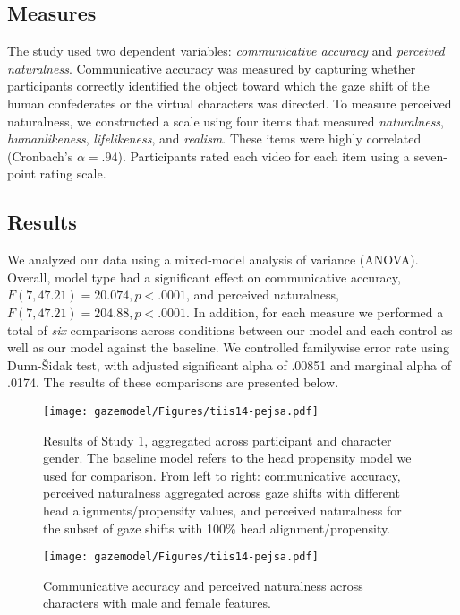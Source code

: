 \subsection{Measures}

The study used two dependent variables: \emph{communicative accuracy} and \emph{perceived naturalness}. Communicative accuracy was measured by capturing whether participants correctly identified the object toward which the gaze shift of the human confederates or the virtual characters was directed. To measure perceived naturalness, we constructed a scale using four items that measured \emph{naturalness}, \emph{humanlikeness}, \emph{lifelikeness}, and \emph{realism}. These items were highly correlated (Cronbach's $\alpha = .94$). Participants rated each video for each item using a seven-point rating scale.

\subsection{Results}

We analyzed our data using a mixed-model analysis of variance (ANOVA). Overall, model type had a significant effect on communicative accuracy, $F(7, 47.21) = 20.074, p < .0001$, and perceived naturalness, $F(7, 47.21) = 204.88, p < .0001$. In addition, for each measure we performed a total of \emph{six} comparisons across conditions between our model and each control as well as our model against the baseline. We controlled familywise error rate using Dunn-\v{S}idak test, with adjusted significant alpha of .00851 and marginal alpha of .0174. The results of these comparisons are presented below.

\begin{figure}
  \centering
  \texttt{[image: gazemodel/Figures/tiis14-pejsa.pdf]}
  \caption{Results of Study 1, aggregated across participant and character gender. The baseline model refers to the head propensity model we used for comparison. From left to right: communicative accuracy, perceived naturalness aggregated across gaze shifts with different head alignments/propensity values, and perceived naturalness for the subset of gaze shifts with 100\% head alignment/propensity.}
  \label{fig:ModelEvalResults}
\end{figure}

\begin{figure}
  \centering
  \texttt{[image: gazemodel/Figures/tiis14-pejsa.pdf]}
  \caption{Communicative accuracy and perceived naturalness across characters with male and female features.}
  \label{fig:ModelEvalResultsGender}
\end{figure}

